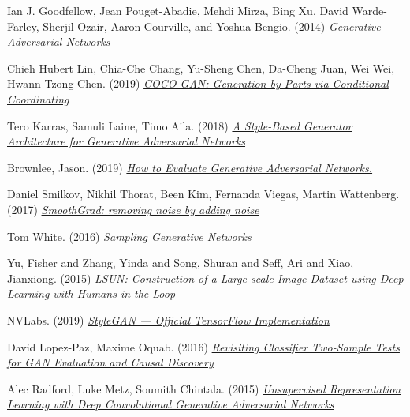 \documentclass[12pt]{article}
\begin{document}
    \begin{thebibliography}{9}
        Ian J. Goodfellow, Jean Pouget-Abadie, Mehdi Mirza, Bing Xu, David Warde-Farley, Sherjil Ozair, Aaron Courville, and Yoshua Bengio. (2014)
        \href{https://papers.nips.cc/paper/2014/file/5ca3e9b122f61f8f06494c97b1afccf3-Paper.pdf}{\textit{Generative Adversarial Networks} }

        Chieh Hubert Lin, Chia-Che Chang, Yu-Sheng Chen, Da-Cheng Juan, Wei Wei, Hwann-Tzong Chen. (2019)
        \href{https://arxiv.org/pdf/1904.00284.pdf}{\textit{COCO-GAN: Generation by Parts via Conditional Coordinating} }

        Tero Karras, Samuli Laine, Timo Aila. (2018)
        \href{https://arxiv.org/pdf/1812.04948.pdf}{\textit{A Style-Based Generator Architecture for Generative Adversarial Networks} }

        Brownlee, Jason. (2019)
        \href{https://machinelearningmastery.com/how-to-evaluate-generative-adversarial-networks/}{\textit{How to Evaluate Generative Adversarial Networks.} }

        Daniel Smilkov, Nikhil Thorat, Been Kim, Fernanda Viegas, Martin Wattenberg. (2017)
        \href{https://arxiv.org/pdf/1706.03825.pdf}{\textit{SmoothGrad: removing noise by adding noise} }

        Tom White. (2016)
        \href{https://arxiv.org/pdf/1609.04468.pdf}{\textit{Sampling Generative Networks} }

        Yu, Fisher and Zhang, Yinda and Song, Shuran and Seff, Ari and Xiao, Jianxiong. (2015)
        \href{https://arxiv.org/pdf/1506.03365.pdf}{\textit{LSUN: Construction of a Large-scale Image Dataset using Deep Learning with Humans in the Loop}}

        NVLabs. (2019) \href{https://github.com/NVlabs/stylegan}{\textit{StyleGAN — Official TensorFlow Implementation}}

        David Lopez-Paz, Maxime Oquab. (2016)
        \href{https://research.fb.com/wp-content/uploads/2017/04/neural_tests.pdf?}{\textit{Revisiting Classifier Two-Sample Tests for GAN Evaluation and Causal Discovery}}

        Alec Radford, Luke Metz, Soumith Chintala. (2015)
        \href{https://arxiv.org/pdf/1511.06434.pdf}{\textit{Unsupervised Representation Learning with Deep Convolutional Generative Adversarial Networks}}

    \end{thebibliography}
\end{document}
